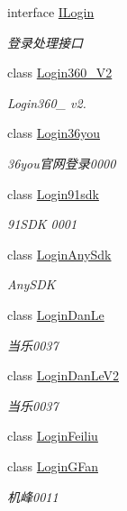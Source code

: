 \begin{DoxyCompactItemize}
interface \mbox{\hyperlink{interface_t_net_1_1_sns_1_1_i_login}{I\+Login}}
\begin{DoxyCompactList}\small\item\em 登录处理接口 \end{DoxyCompactList}\item 
class \mbox{\hyperlink{class_t_net_1_1_sns_1_1_login360___v2}{Login360\+\_\+\+V2}}
\begin{DoxyCompactList}\small\item\em Login360\+\_\+ v2. \end{DoxyCompactList}\item 
class \mbox{\hyperlink{class_t_net_1_1_sns_1_1_login36you}{Login36you}}
\begin{DoxyCompactList}\small\item\em 36you官网登录0000 \end{DoxyCompactList}\item 
class \mbox{\hyperlink{class_t_net_1_1_sns_1_1_login91sdk}{Login91sdk}}
\begin{DoxyCompactList}\small\item\em 91\+S\+DK 0001 \end{DoxyCompactList}\item 
class \mbox{\hyperlink{class_t_net_1_1_sns_1_1_login_any_sdk}{Login\+Any\+Sdk}}
\begin{DoxyCompactList}\small\item\em Any\+S\+DK \end{DoxyCompactList}\item 
class \mbox{\hyperlink{class_t_net_1_1_sns_1_1_login_dan_le}{Login\+Dan\+Le}}
\begin{DoxyCompactList}\small\item\em 当乐0037 \end{DoxyCompactList}\item 
class \mbox{\hyperlink{class_t_net_1_1_sns_1_1_login_dan_le_v2}{Login\+Dan\+Le\+V2}}
\begin{DoxyCompactList}\small\item\em 当乐0037 \end{DoxyCompactList}\item 
class \mbox{\hyperlink{class_t_net_1_1_sns_1_1_login_feiliu}{Login\+Feiliu}}
\item 
class \mbox{\hyperlink{class_t_net_1_1_sns_1_1_login_g_fan}{Login\+G\+Fan}}
\begin{DoxyCompactList}\small\item\em 机峰0011 \end{DoxyCompactList}\item 

\end{DoxyCompactItemize}
